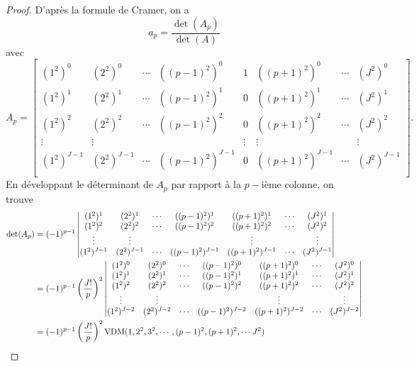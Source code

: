 \begin{proof}
D'après la formule de Cramer, on a 
\begin{equation}
a_p = \dfrac{\det (A_p)}{\det (A)}
\end{equation}
avec
\begin{equation}
A_p = \begin{bmatrix}
(1^2)^0 & (2^2)^0 & \cdots & ((p-1)^2)^0 & 1 & ((p+1)^2)^0 & \cdots & (J^2)^0 \\ 
(1^2)^1 & (2^2)^1 & \cdots & ((p-1)^2)^1 & 0 & ((p+1)^2)^1 & \cdots & (J^2)^1 \\
(1^2)^2 & (2^2)^2 & \cdots & ((p-1)^2)^2 & 0 & ((p+1)^2)^2 & \cdots & (J^2)^2 \\
\vdots & \vdots &  &  & \vdots & \vdots &  & \vdots \\
(1^2)^{J-1} & (2^2)^{J-1} & \cdots & ((p-1)^2)^{J-1} & 0 & ((p+1)^2)^{J-1} & \cdots & (J^2)^{J-1} \\
\end{bmatrix} .
\end{equation}
En développant le déterminant de $A_p$ par rapport à la $p-$ième colonne, on trouve
\begin{align*}
\det (A_p) & = (-1)^{p-1}  \begin{vmatrix}
(1^2)^1 & (2^2)^1 & \cdots & ((p-1)^2)^1 & ((p+1)^2)^1 & \cdots & (J^2)^1 \\
(1^2)^2 & (2^2)^2 & \cdots & ((p-1)^2)^2 & ((p+1)^2)^2 & \cdots & (J^2)^2 \\
\vdots & \vdots &  &  & \vdots & & \vdots \\
(1^2)^{J-1} & (2^2)^{J-1} & \cdots & ((p-1)^2)^{J-1} & ((p+1)^2)^{J-1} & \cdots & (J^2)^{J-1} \\
\end{vmatrix} \\
	& = (-1)^{p-1} \left( \dfrac{J!}{p} \right)^2 \begin{vmatrix}
(1^2)^0 & (2^2)^0 & \cdots & ((p-1)^2)^0 & ((p+1)^2)^0 & \cdots & (J^2)^0 \\ 
(1^2)^1 & (2^2)^1 & \cdots & ((p-1)^2)^1 & ((p+1)^2)^1 & \cdots & (J^2)^1 \\
(1^2)^2 & (2^2)^2 & \cdots & ((p-1)^2)^2 & ((p+1)^2)^2 & \cdots & (J^2)^2 \\
\vdots & \vdots &  &  & \vdots & & \vdots \\
(1^2)^{J-2} & (2^2)^{J-2} & \cdots & ((p-1)^2)^{J-2} & ((p+1)^2)^{J-2} & \cdots & (J^2)^{J-2} \\
\end{vmatrix} \\
	& = (-1)^{p-1} \left( \dfrac{J!}{p} \right)^2 \VDM(1, 2^2, 3^2, \cdots , (p-1)^2, (p+1)^2, \cdots J^2 ) \\

\end{align*}
\end{proof}
